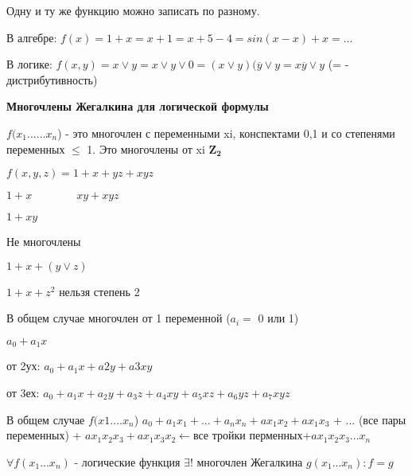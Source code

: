 \documentclass[russian]{lecture-notes}
\begin{document}
\begin{sloppypar}
\begin{proposition}
\begin{remark}
                Одну и ту же функцию можно записать по разному.

            \end{remark}

            В алгебре: $f(x) = 1 +x = x + 1 = x + 5 - 4 = sin(x-x) + x = ...$

            В логике: $f(x,y) = x \lor y = x \lor y \lor 0 = (x \lor y)(\overline{y} \lor y = x\overline{y} \lor y$ (= - дистрибутивность)

            \textbf{Многочлены Жегалкина для логической формулы}


            \begin{definition}
                $f(x_{1}......x_{n}$) - это многочлен с переменными xi, конспектами 0,1 и со степенями переменных $\leqslant$ 1. Это многочлены от xi $\mathbf{Z_{2}}$
            \end{definition}

            \begin{example}

                $f(x,y,z) = 1 + x + yz + xyz$

                $1 + x \qquad \qquad xy+xyz$

                $1 + xy$
            \end{example}

            Не многочлены

            $1 + x + (y \lor z)$

            $1 + x + z^{2}$ нельзя степень 2


            \begin{remark}
                В общем случае многочлен от 1 переменной ($a_{i} =$ 0 или 1)

                $a_{0} + a_{1}x$

                от 2ух: $a_{0} + a_{1}x+a{2}y+a{3}xy$

                от 3ех: $a_{0} + a_{1}x + a_{2}y + a_{3}z + a_{4}xy + a_{5}xz + a_{6}yz + a_{7}xyz$

            \end{remark}

            В общем случае $f(x1....x_{n}$) $a_{0} + a_{1}x_{1} + ... + a_{n}x_{n} + ax_{1}x_{2} + ax_{1}x_{3}$ + ... (все пары переменных) + $ ax_{1}x_{2}x_{3}+ax_{1}x_{3}x_{2} \leftarrow $все тройки перменных$ + ax_{1}x_{2}x_{3}...x_{n}$

            \begin{definition}
                $\forall f(x_{1}...x_{n})$ - логические функция $\exists!$ многочлен Жегалкина $g(x_{1}...x_{n}) : f = g$
            \end{definition}


\end{proposition}
\end{sloppypar}
\end{document}
